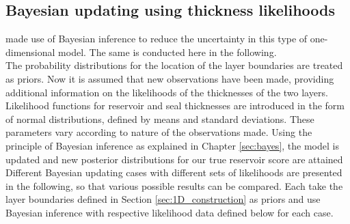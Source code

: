 			\subsection{Bayesian updating using thickness likelihoods}
			\citet{delaVarga2016} made use of Bayesian inference to reduce the uncertainty in this type of one-dimensional model. The same is conducted here in the following.\\				
			The probability distributions for the location of the layer boundaries are treated as priors. Now it is assumed that new observations have been made, providing additional information on the likelihoods of the thicknesses of the two layers. Likelihood functions for reservoir and seal thicknesses are introduced in the form of normal distributions, defined by means and standard deviations. These parameters vary according to nature of the observations made. Using the principle of Bayesian inference as explained in Chapter \ref{sec:bayes}, the model is updated and new posterior distributions for our true reservoir score are attained\\
			Different Bayesian updating cases with different sets of likelihoods are presented in the following, so that various possible results can be compared. Each take the layer boundaries defined in Section \ref{sec:1D_construction} as priors and use Bayesian inference with respective likelihood data defined below for each case.
				
